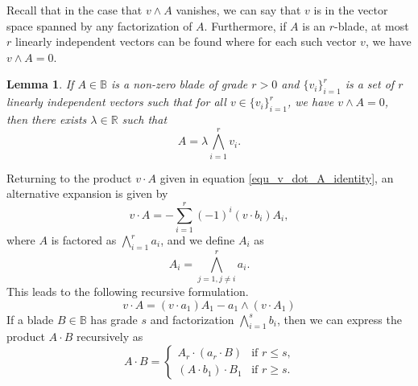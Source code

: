 \documentclass{birkjour}
\newtheorem{lem}[thm]{Lemma}
\theoremstyle{definition}
\theoremstyle{remark}
\numberwithin{equation}{section}
\newcommand{\R}{\mathbb{R}}
\newcommand{\B}{\mathbb{B}}
\begin{document}
Recall that in the case that $v\wedge A$ vanishes, we can say that $v$ is
in the vector space spanned by any factorization of $A$.  Furthermore,
if $A$ is an $r$-blade, at most $r$ linearly independent vectors can be
found where for each such vector $v$, we have $v\wedge A=0$.

\begin{lem}
If $A\in\B$ is a non-zero blade of grade $r>0$ and $\{v_i\}_{i=1}^r$ is a set
of $r$ linearly independent vectors such that for all $v\in\{v_i\}_{i=1}^r$,
we have $v\wedge A=0$, then there exists $\lambda\in\R$ such that
\begin{equation*}
A = \lambda\bigwedge_{i=1}^r v_i.
\end{equation*}
\end{lem}

Returning to the product $v\cdot A$ given in equation \eqref{equ_v_dot_A_identity},
an alternative expansion is given by
\begin{equation}\label{equ_v_dot_A_sum}
v\cdot A = -\sum_{i=1}^r (-1)^i(v\cdot b_i)A_i,
\end{equation}
where $A$ is factored as $\bigwedge_{i=1}^r a_i$, and we define $A_i$ as
\begin{equation*}
A_i = \bigwedge_{j=1,j\neq i}^r a_i.
\end{equation*}
This leads to the following recursive formulation.
\begin{equation*}
v\cdot A=(v\cdot a_1)A_1-a_1\wedge(v\cdot A_1)
\end{equation*}
If a blade $B\in\B$ has grade $s$ and factorization $\bigwedge_{i=1}^s b_i$, then
we can express the product $A\cdot B$ recursively as
\begin{equation*}
A\cdot B = \left\{\begin{array}{ll}
A_r\cdot (a_r\cdot B) & \mbox{if $r\leq s$,} \\
(A\cdot b_1)\cdot B_1 & \mbox{if $r\geq s$.}
\end{array}\right.
\end{equation*}
\end{document}
